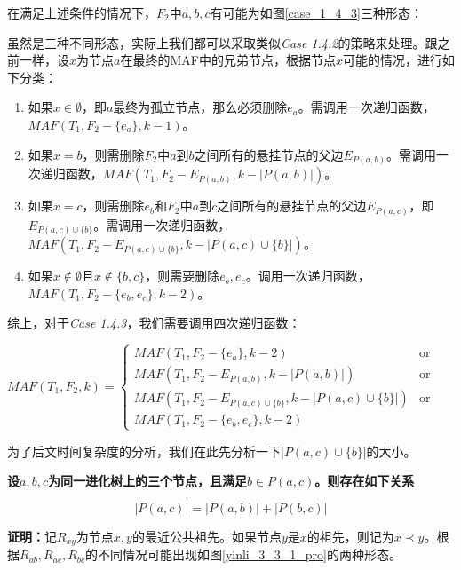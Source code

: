 在满足上述条件的情况下，$F_2$中$a,b,c$有可能为如图\ref{case_1_4_3}三种形态：

虽然是三种不同形态，实际上我们都可以采取类似\textit{Case 1.4.2}的策略来处理。跟之前一样，设$x$为节点$a$在最终的MAF中的兄弟节点，根据节点$x$可能的情况，进行如下分类：
\begin{enumerate}
	\item 如果$x \in \emptyset$，即$a$最终为孤立节点，那么必须删除$e_a$。需调用一次递归函数，$MAF(T_1,F_2-\{e_a\},k-1)$。
	\item 如果$x = b$，则需删除$F_2$中$a$到$b$之间所有的悬挂节点的父边$E_{P(a,b)}$。需调用一次递归函数，$MAF(T_1,F_2-E_{P(a,b)},k-|P(a,b)|)$。
	\item 如果$x = c$，则需删除$e_b$和$F_2$中$a$到$c$之间所有的悬挂节点的父边$E_{P(a,c)}$，即$E_{P(a,c) \cup \{b\}}$。需调用一次递归函数，$MAF(T_1,F_2-E_{P(a,c) \cup \{b\}},k-|P(a,c) \cup \{b\}|)$。
	\item 如果$x \notin \emptyset$且$x \notin \{b,c\}$，则需要删除$e_b,e_c$。调用一次递归函数，$MAF(T_1,F_2-\{e_b,e_c\},k-2)$。
\end{enumerate}
\clearpage
综上，对于\textit{Case 1.4.3}，我们需要调用四次递归函数：
\begin{center}
$MAF(T_1,F_2,k) = \left\{
\begin{array}{lr}
         MAF(T_1,F_2-\{e_a\},k-2) & \mbox{or}\\ 
         MAF(T_1,F_2-E_{P(a,b)},k-|P(a,b)|) & \mbox{or}\\
         MAF(T_1,F_2-E_{P(a,c) \cup \{b\}},k-|P(a,c) \cup \{b\}|) & \mbox{or}\\
         MAF(T_1,F_2-\{e_b,e_c\},k-2) & 
\end{array}
\right.$
\end{center}

为了后文时间复杂度的分析，我们在此先分析一下$|P(a,c) \cup \{b\}|$的大小。

\begin{yinli}\label{yinli2}
\textbf{	
设$a,b,c$为同一进化树上的三个节点，且满足$b \in P(a,c)$。则存在如下关系}
\end{yinli}
\begin{equation*}
\textbf{$|P(a,c)| = |P(a,b)|+|P(b,c)|$}
\end{equation*}

\textbf{证明：}记$R_{xy}$为节点$x,y$的最近公共祖先。如果节点$y$是$x$的祖先，则记为$x \prec y$。根据$R_{ab},R_{ac},R_{bc}$的不同情况可能出现如图\ref{yinli_3_3_1_pro}的两种形态。

